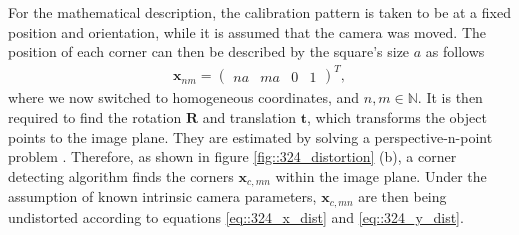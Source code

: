 For the mathematical description, the calibration pattern is taken to be at a fixed position and orientation, while it is assumed that the camera was moved. The position of each corner can then be described by the square's size $a$ as follows
\begin{align}
	\bm{x}_{nm} = \begin{pmatrix}
	na & ma & 0 & 1
	\end{pmatrix}^T,
\end{align}
where we now switched to homogeneous coordinates, and $n,m\in\mathbb{N}$. It is then required to find the rotation $\bm{R}$ and translation $\bm{t}$, which transforms the object points to the image plane. They are estimated by solving a perspective-n-point problem \cite{fischler1981random}. Therefore, as shown in figure \ref{fig::324_distortion} (b), a corner detecting algorithm finds the corners $\bm{x}_{c,mn}$ within the image plane. Under the assumption of known intrinsic camera parameters, $\bm{x}_{c,mn}$ are then being undistorted according to equations \ref{eq::324_x_dist} and \ref{eq::324_y_dist}. 
